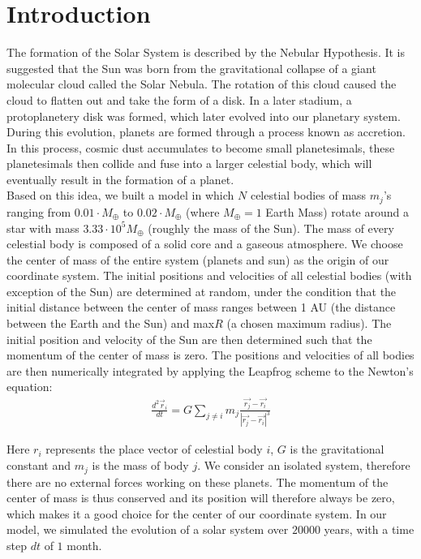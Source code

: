 \section{Introduction}
The formation of the Solar System is described by the Nebular Hypothesis. It is suggested that the Sun was born from the gravitational collapse of a giant molecular cloud called the Solar Nebula. 
The rotation of this cloud caused the cloud to flatten out and take the form of a disk. In a later stadium, a protoplanetery disk was formed, which later evolved into our planetary system.
During this evolution, planets are formed through a process known as accretion.
In this process, cosmic dust accumulates to become small planetesimals, these planetesimals then collide and fuse into a larger celestial body, which will eventually result in the formation of a planet.\\

Based on this idea, we built a model in which \(N\) celestial bodies of mass $m_j$'s ranging from $0.01\cdot M_{\oplus}$ to $0.02\cdot M_{\oplus}$ (where $M_{\oplus}=1$ Earth Mass) rotate around a star with mass $3.33\cdot 10^5 M_{\oplus}$ (roughly the mass of the Sun).
The mass of every celestial body is composed of a solid core and a gaseous atmosphere.
We choose the center of mass of the entire system (planets and sun) as the origin of our coordinate system. 
The initial positions and velocities of all celestial bodies (with exception of the Sun) are determined at random, under the condition that the initial distance between the center of mass ranges between 1 AU (the distance between the Earth and the Sun) and  max\(R\) (a chosen maximum radius). 
The initial position and velocity of the Sun are then determined such that the momentum of the center of mass is zero. 
The positions and velocities of all bodies are then numerically integrated by applying the Leapfrog scheme to the Newton's equation:
\begin{align}
\frac{d^2\vec{r}_i}{dt}=G\sum_{j\neq i}m_j\frac{\vec{r_j}-\vec{r_i}}{|\vec{r_j}-\vec{r_i}|^3}\label{eq:newton}
\end{align}

Here \(r_i\) represents the place vector of celestial body \(i\), \(G\) is the gravitational constant and \(m_j\) is the mass of body \(j\).
We consider an isolated system, therefore there are no external forces working on these planets. 
The momentum of the center of mass is thus conserved and its position will therefore always be zero, which makes it a good choice for the center of our coordinate system. 
In our model, we simulated the evolution of a solar system over $20000$ years, with a time step $dt$ of $1$ month.\\

